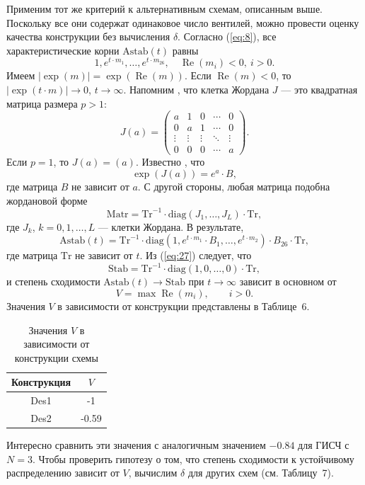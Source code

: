 \documentclass[a4paper,12pt]{article}
\begin{document}
Применим тот же критерий к альтернативным схемам, описанным выше. Поскольку все они содержат одинаковое число вентилей, можно провести оценку качества конструкции без вычисления $\delta$. Согласно (\ref{eq:8}), все характеристические корни $\mathrm{Astab}(t)$ равны
\[
1, e^{t\cdot m_1}, \ldots, e^{t\cdot m_{26}},\quad \operatorname{Re}(m_i)<0,\ i>0.
\]
Имеем $|\exp(m)| = \exp(\operatorname{Re}(m))$. Если $\operatorname{Re}(m)<0$, то $|\exp(t\cdot m)| \to 0$, $t\to\infty$. Напомним \cite{bellman1960}, что клетка Жордана $J$ --- это квадратная матрица размера $p>1$:
\[
J(a) = \begin{pmatrix}
a & 1 & 0 & \cdots & 0 \\
0 & a & 1 & \cdots & 0 \\
\vdots & \vdots & \vdots & \ddots & \vdots \\
0 & 0 & 0 & \cdots & a
\end{pmatrix}.
\]
Если $p=1$, то $J(a) = (a)$. Известно \cite{bellman1960}, что
\[
\exp(J(a)) = e^{a}\cdot B,
\]
где матрица $B$ не зависит от $a$. С другой стороны, любая матрица подобна жордановой форме
\[
\mathrm{Matr} = \mathrm{Tr}^{-1}\cdot \mathrm{diag}(J_1,\ldots,J_L)\cdot \mathrm{Tr},
\]
где $J_k$, $k=0,1,\ldots,L$ --- клетки Жордана. В результате,
\begin{equation}
\mathrm{Astab}(t) = \mathrm{Tr}^{-1}\cdot \mathrm{diag}(1, e^{t\cdot m_1}\cdot B_1, \ldots, e^{t\cdot m_2})\cdot B_{26}\cdot \mathrm{Tr},
\label{eq:27}
\end{equation}
где матрица $\mathrm{Tr}$ не зависит от $t$. Из (\ref{eq:27}) следует, что
\[
\mathrm{Stab} = \mathrm{Tr}^{-1}\cdot \mathrm{diag}(1,0,\ldots,0)\cdot \mathrm{Tr},
\]
и степень сходимости $\mathrm{Astab}(t)\to \mathrm{Stab}$ при $t\to\infty$ зависит в основном от
\begin{equation}
V = \max \operatorname{Re}(m_i),\qquad i>0.
\label{eq:28}
\end{equation}
Значения $V$ в зависимости от конструкции представлены в Таблице~6.

\begin{table}[h]
\centering
\caption{Значения $V$ в зависимости от конструкции схемы}
\label{tab:6}
\begin{tabular}{c|c}
Конструкция & $V$ \\ \hline
Des1 & -1 \\
Des2 & -0.59
\end{tabular}
\end{table}

Интересно сравнить эти значения с аналогичным значением $-0.84$ для ГИСЧ с $N=3$. Чтобы проверить гипотезу о том, что степень сходимости к устойчивому распределению зависит от $V$, вычислим $\delta$ для других схем (см. Таблицу~7).
\end{document}
